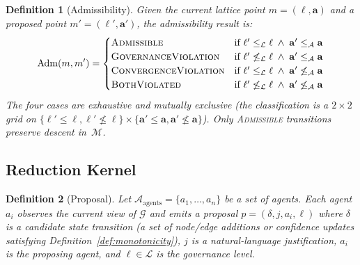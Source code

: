 \documentclass[11pt]{article}
\newtheorem{definition}{Definition}
\begin{document}
\begin{definition}[Admissibility]
\label{def:admissibility}
Given the current lattice point $m = (\ell, \mathbf{a})$ and a proposed point $m' = (\ell', \mathbf{a}')$, the \emph{admissibility result} is:
\[
\mathrm{Adm}(m, m') = \begin{cases}
  \textsc{Admissible}           & \text{if } \ell' \leq_{\mathcal{L}} \ell \;\wedge\; \mathbf{a}' \leq_{\mathcal{A}} \mathbf{a} \\
  \textsc{GovernanceViolation}  & \text{if } \ell' \not\leq_{\mathcal{L}} \ell \;\wedge\; \mathbf{a}' \leq_{\mathcal{A}} \mathbf{a} \\
  \textsc{ConvergenceViolation} & \text{if } \ell' \leq_{\mathcal{L}} \ell \;\wedge\; \mathbf{a}' \not\leq_{\mathcal{A}} \mathbf{a} \\
  \textsc{BothViolated}         & \text{if } \ell' \not\leq_{\mathcal{L}} \ell \;\wedge\; \mathbf{a}' \not\leq_{\mathcal{A}} \mathbf{a}
\end{cases}
\]
The four cases are exhaustive and mutually exclusive (the classification is a $2 \times 2$ grid on $\{\ell' \leq \ell, \ell' \not\leq \ell\} \times \{\mathbf{a}' \leq \mathbf{a}, \mathbf{a}' \not\leq \mathbf{a}\}$). Only \textsc{Admissible} transitions preserve descent in~$\mathcal{M}$.
\end{definition}

\subsection{Reduction Kernel}

\begin{definition}[Proposal]
\label{def:proposal}
Let $\mathcal{A}_{\text{agents}} = \{a_1, \ldots, a_n\}$ be a set of agents. Each agent $a_i$ observes the current view of $\mathcal{G}$ and emits a \emph{proposal} $p = (\delta, j, a_i, \ell)$ where $\delta$ is a candidate state transition (a set of node/edge additions or confidence updates satisfying Definition~\ref{def:monotonicity}), $j$ is a natural-language justification, $a_i$ is the proposing agent, and $\ell \in \mathcal{L}$ is the governance level.
\end{definition}
\end{document}
